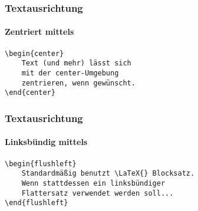 \begin{frame}[fragile]
    \frametitle{Textausrichtung}
    \framesubtitle{Zentriert mittels }

    \begin{center}
    \end{center}
    \pause
    
    \begin{center}
    \begin{codeblock}
\begin{verbatim}
\begin{center}
    Text (und mehr) lässt sich
    mit der center-Umgebung
    zentrieren, wenn gewünscht.
\end{center}
\end{verbatim}
\end{codeblock}
    \end{center}
\end{frame}


\begin{frame}[fragile]
    \frametitle{Textausrichtung}
    \framesubtitle{Linksbündig mittels }

    \begin{center}
    \end{center}
    \pause
    
    \begin{center}
    \begin{codeblock}
\begin{verbatim}
\begin{flushleft}
    Standardmäßig benutzt \LaTeX{} Blocksatz.
    Wenn stattdessen ein linksbündiger
    Flattersatz verwendet werden soll...
\end{flushleft}
\end{verbatim}
    \end{codeblock}
    \end{center}
\end{frame}


